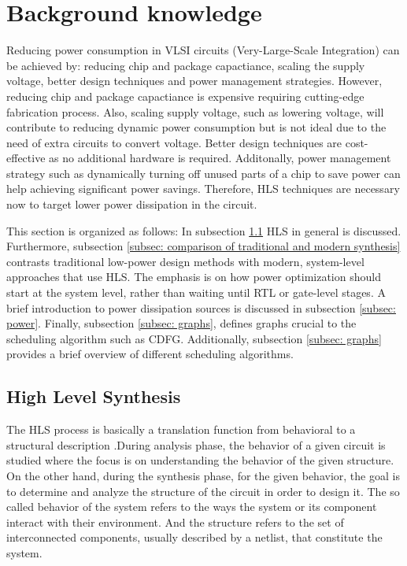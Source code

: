 \documentclass[conference]{IEEEtran}
\begin{document}
\section{Background knowledge}
\label{sec: fundamentals}
Reducing power consumption in VLSI circuits (Very-Large-Scale Integration) can be achieved by: reducing chip and package capactiance, scaling the supply voltage, better design techniques and power management strategies. However, reducing chip and package capactiance is expensive requiring cutting-edge fabrication process. Also, scaling supply voltage, such as lowering voltage, will contribute to reducing dynamic power consumption but is not ideal due to the need of extra circuits to convert voltage. Better design techniques are cost-effective as no additional hardware is required. Additonally, power management strategy such as dynamically turning off unused parts of a chip to save power can help achieving significant power savings. Therefore, HLS techniques are necessary now to target lower power dissipation in the circuit.

This section is organized as follows: In subsection \ref{subsec: HLS} HLS in general is discussed. Furthermore, subsection \ref{subsec: comparison of traditional and modern synthesis} contrasts traditional low-power design methods with modern, system-level approaches that use HLS. The emphasis is on how power optimization should start at the system level, rather than waiting until RTL or gate-level stages. A brief introduction to power dissipation sources is discussed in subsection \ref{subsec: power}. Finally, subsection \ref{subsec: graphs}, defines graphs crucial to the scheduling algorithm such as CDFG. Additionally, subsection \ref{subsec: graphs} provides a brief overview of different scheduling algorithms.


\subsection{High Level Synthesis}
\label{subsec: HLS}
The HLS process is basically a translation function from behavioral to a structural description \cite{DDG92}.During analysis phase, the behavior of a given circuit is studied where the focus is on understanding the behavior of the given structure. On the other hand, during the synthesis phase, for the given behavior, the goal is to determine and analyze the structure of the circuit in order to design it. The so called behavior of the system refers to the ways the system or its component interact with their environment. And the structure refers to the set of interconnected components, usually described by a netlist, that constitute the system. 
\end{document}
